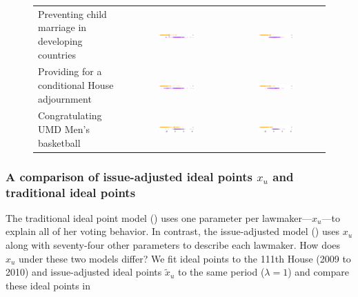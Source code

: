 \begin{figure}
\begin{tabular}{|p{4.3cm}|c|c|}
Preventing child marriage in developing countries
& \includegraphics[width=0.4\textwidth]{chapter_inferring_issue_preferences/figures/3397_ideal_point_3.pdf}
& \includegraphics[width=0.4\textwidth]{chapter_inferring_issue_preferences/figures/3397_adjusted_ideal_point_3.pdf} \\

Providing for a conditional House adjournment
& \includegraphics[width=0.4\textwidth]{chapter_inferring_issue_preferences/figures/3397_ideal_point_2.pdf}
& \includegraphics[width=0.4\textwidth]{chapter_inferring_issue_preferences/figures/3397_adjusted_ideal_point_2.pdf} \\

Congratulating UMD Men's basketball
& \includegraphics[width=0.4\textwidth]{chapter_inferring_issue_preferences/figures/3397_ideal_point_1.pdf}
& \includegraphics[width=0.4\textwidth]{chapter_inferring_issue_preferences/figures/3397_adjusted_ideal_point_1.pdf} \\
\hline
  \end{tabular}
\end{figure}

\subsubsection{A comparison of issue-adjusted ideal points $x_u$ and traditional ideal points}
The traditional ideal point model () uses one parameter
per lawmaker---$x_u$---to explain all of her voting behavior.  In
contrast, the issue-adjusted model () uses
$x_u$ along with seventy-four other parameters to describe each
lawmaker.  How does $x_u$ under these two models differ?  We fit
ideal points to the 111th House (2009 to 2010) and issue-adjusted
ideal points $\tilde x_u$ to the same period ($\lambda=1$) and compare
these ideal points in 

